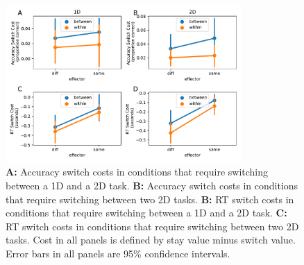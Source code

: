 \documentclass[doc, floatsintext]{apa7}
\begin{document}
\begin{figure}[h!]
    \centering
    \includegraphics[width=0.8\textwidth]{../figures/fig_6.pdf}
    \caption{
        \textbf{A:} Accuracy switch costs in conditions that
        require switching between a 1D and a 2D task.
        \textbf{B:} Accuracy switch costs in conditions that
        require switching between two 2D tasks.
        \textbf{B:} RT switch costs in conditions that require
        switching between a 1D and a 2D task.
        \textbf{C:} RT switch costs in conditions that require
        switching between two 2D tasks.  Cost in all panels is
        defined by stay value minus switch value. Error bars in
        all panels are 95\% confidence intervals.
    }
    \label{fig_6}
\end{figure}


\end{document}
